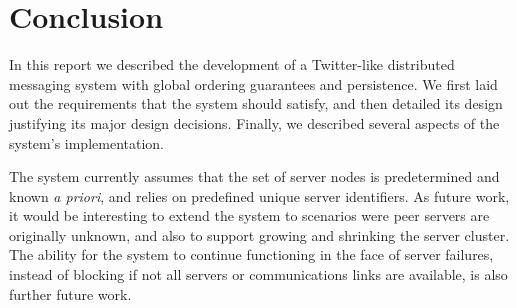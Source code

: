 
\section{Conclusion}
\label{sec:conclusion}

In this report we described the development of a Twitter-like distributed messaging system with global ordering guarantees and persistence. We first laid out the requirements that the system should satisfy, and then detailed its design justifying its major design decisions. Finally, we described several aspects of the system's implementation.

The system currently assumes that the set of server nodes is predetermined and known \emph{a priori}, and relies on predefined unique server identifiers. As future work, it would be interesting to extend the system to scenarios were peer servers are originally unknown, and also to support growing and shrinking the server cluster. The ability for the system to continue functioning in the face of server failures, instead of blocking if not all servers or communications links are available, is also further future work.

